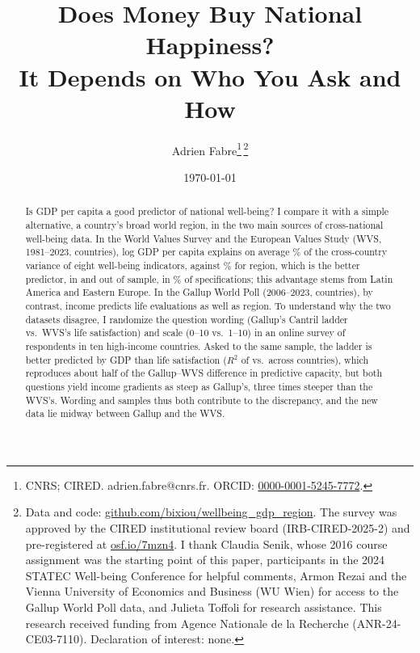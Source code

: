 \documentclass[12pt]{article}
\title{Does Money Buy National Happiness?\\It Depends on Who You Ask and How}
\author{}
\date{}
\author{Adrien Fabre\thanks{CNRS; CIRED. adrien.fabre@cnrs.fr. ORCID: \href{https://orcid.org/0000-0001-5245-7772}{0000-0001-5245-7772}.}\,\thanks{Data and code: %
    \href{https://github.com/bixiou/wellbeing_gdp_region}{github.com/bixiou/wellbeing\_gdp\_region}. %
    The survey was approved by the CIRED institutional review board (IRB-CIRED-2025-2) and pre-registered at \href{https://osf.io/7mzn4}{osf.io/7mzn4}. I thank Claudia Senik, whose 2016 course assignment was the starting point of this paper, participants in the 2024 STATEC Well-being Conference for helpful comments, Armon Rezai and the Vienna University of Economics and Business (WU Wien) for access to the Gallup World Poll data, and Julieta Toffoli for research assistance. This research received funding from Agence Nationale de la Recherche (ANR-24-CE03-7110). Declaration of interest: none.}}
\date{\today}
\begin{document}
\maketitle

\begin{abstract}
\noindent Is GDP per capita a good predictor of national well-being? I compare it with a simple alternative, a country's broad world region, in the two main sources of cross-national well-being data. In the World Values Survey and the European Values Study (WVS, 1981--2023, \nWVSCountries countries), log GDP per capita explains on average \meanRtwoIncomePPP\% of the cross-country variance of eight well-being indicators, against \meanRtwoRegion\% for region, which is the better predictor, in and out of sample, in \shareRegionBetterWVS\% of \nSpecsWVS specifications; this advantage stems from Latin America and Eastern Europe. In the Gallup World Poll (2006--2023, \nGallupCountries countries), by contrast, income predicts life evaluations as well as region. To understand why the two datasets disagree, I randomize the question wording (Gallup's Cantril ladder vs.\ WVS's life satisfaction) and scale (0--10 vs.\ 1--10) in an online survey of \nFabre respondents in ten high-income countries. Asked to the same sample, the ladder is better predicted by GDP than life satisfaction ($R^2$ of \RtwoTenFabreLadderPooled vs.\ \RtwoTenFabreSatisfactionPooled across countries), which reproduces about half of the Gallup--WVS difference in predictive capacity, but both questions yield income gradients as steep as Gallup's, three times steeper than the WVS's. Wording and samples thus both contribute to the discrepancy, and the new data lie midway between Gallup and the WVS.
\end{abstract}
\end{document}
